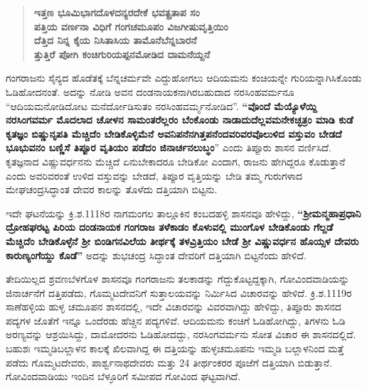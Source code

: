 \begin{verse}
\textbf{ಇತ್ತಣ ಭೂಮಿಭಾಗದೊಳದನ್ಯರದೇಕೆ ಭವತ್ಪ್ರತಾಪ ಸಂ} \\\textbf{ಪತ್ತಿಯ ವರ್ಣನಾ ವಿಧಿಗೆ ಗಂಗಚಮೂಪಂ ವಿಜಗೀಷುವೃತ್ತಿಯಿಂ} \\\textbf{ದೆತ್ತಿದ ನಿನ್ನ ಕೈಯ ನಿಸಿತಾಸಿಯ ತಾಮೊನೆಬೆನ್ನಬಾರನೆ} \\\textbf{ತ್ತುತ್ತಿರೆ ಪೋಗಿ ಕಂಚಿಗುರಿಯಪ್ಪನಮೋಡಿದ ದಾಮನೆಯ್ದನೆ}
\end{verse}

ಗಂಗರಾಜನು ಸೈನ್ಯದ ಹೊಡೆತಕ್ಕೆ ಬೆನ್ನಚರ್ಮವೇ ಎದ್ದುಹೋಗಲು ಆದಿಯಮನು ಕಂಚಿಯನ್ನೇ ಗುರಿಯನ್ನಾಗಿಸಿ\-ಕೊಂಡು ಓಡಿಹೋದನಂತೆ. ಅದನ್ನು ನೋಡಿ ಅವನ ದಂಡನಾಯಕನಾಗಿರಬಹುದಾದ ನರಸಿಂಹವರ್ಮನೂ “ಆದಿಯಮ\-ನೋಡಿದೋಟ ಮನೆರ್ದೋಡಿಸುತಂ ನರಸಿಂಹವರ್ಮ್ಮನೋಡಿದ”. \textbf{“ವೊಂದೆ ಮೆಯ್ಯೊಳೆಯ್ದಿ ನರಸಿಂಗವರ್ಮ ಮೊದಲಾದ ಚೋಳನ ಸಾಮಂತರೆಲ್ಲರಂ ಬೆಂಕೊಂಡು ನಾಡಾದುದೆಲ್ಲವಮನೇಕಚ್ಛತ್ರಂ ಮಾಡಿ ಕುಡೆ ಕೃತಜ್ಞಂ ಬಿಷ್ಣುನೃಪತಿ ಮೆಚ್ಚಿದೆಂ ಬೇಡಿಕೊಳ್ಳಿಮೆನೆ ಅವನಿಪನೆನಗಿತ್ತಪನೆಂದವರಿವರವೊಲುಳಿದ ವಸ್ತುವಂ ಬೇಡದೆ ಭೂಭುವನಂ ಬಣ್ಣಿಸೆ ತಿಪ್ಪೂರ ವೃತಿಯಂ ಪಡೆದಂ\general{\break } ಜಿನಾರ್ಚನಲುಬ್ಧಂ}” ಎಂದು ತಿಪ್ಪೂರು ಶಾಸನ ವರ್ಣಿಸಿದೆ. ಕೃತಜ್ಞನಾದ ವಿಷ್ಣುವರ್ಧನನು ಮೆಚ್ಚಿದೆ ಏನುಬೇಕಾದರೂ ಬೇಡಿಕೋ ಎಂದಾಗ, ರಾಜನು ಹೇಗಿದ್ದರೂ ಕೊಡುತ್ತಾನೆ ಎಂದು ಅವರಿವರಂತೆ ಉಳಿದ ವಸ್ತುವನ್ನು ಬೇಡದೆ, ತಿಪ್ಪೂರ ವೃತ್ತಿಯನ್ನು ಬೇಡಿ ತಮ್ಮ ಗುರುಗಳಾದ ಮೇಘಚಂದ್ರಸಿದ್ಧಾಂತ ದೇವರ ಕಾಲನ್ನು ತೊಳೆದು ದತ್ತಿಯಾಗಿ ಬಿಟ್ಟನು.

ಇದೇ ಘಟನೆಯನ್ನು ಕ್ರಿ.ಶ.1118ರ ನಾಗಮಂಗಲ ತಾಲ್ಲೂಕಿನ ಕಂಬದಹಳ್ಳಿ ಶಾಸನವೂ ಹೇಳಿದ್ದು, \textbf{“ಶ‍್ರೀಮನ್ಮಹಾ\-ಪ್ರಧಾನಿ ದ್ರೋಹಘರಟ್ಟ ಪಿರಿಯ ದಂಡನಾಯಕ ಗಂಗರಾಜ ತಳೆಕಾಡಂ ಕೊಳುವಲ್ಲಿ ಮುಂಗೊಳ ಬೇಡಿಕೊಂಡು ಗೆಲ್ದಡೆ ಮೆಚ್ಚಿದೆಂ ಬೇಡಿಕೊಳ್ಳೆನೆ ಶ‍್ರೀ ಬಿಂಡಿಗನವಿಲೆಯ ತೀರ್ಥಕ್ಕೆ ತಳವ್ರಿತ್ತಿಯಂ ಬೇಡೆ ಶ‍್ರೀ ವಿಷ್ಣುವರ್ಧನ ಹೊಯ್ಸಳ ದೇವರು ಕಾರುಣ್ಯಂಗೆಯ್ದು ಕೊಡೆ” }ಅದನ್ನು ಶುಭಚಂದ್ರ ಸಿದ್ಧಾಂತ ದೇವರಿಗೆ ದತ್ತಿಯಾಗಿ ಬಿಟ್ಟನೆಂದು ಹೇಳಿದೆ.

ತೇದಿಯಿಲ್ಲದ ಶ್ರವಣಬೆಳಗೊಳ ಶಾಸನವೂ ಗಂಗರಾಜನು ತಲಕಾಡನ್ನು ಗೆದ್ದುಕೊಟ್ಟದ್ದಕ್ಕಾಗಿ, ಗೋವಿಂದವಾಡಿಯನ್ನು ಜಿನಾರ್ಚನೆಗೆ ದತ್ತಿಪಡೆದು, ಗೊಮ್ಮಟದೇವನಿಗೆ ಸುತ್ತಾಲಯವನ್ನು ನಿರ್ಮಿಸಿದ ವಿಚಾರವನ್ನು ಹೇಳಿದೆ. ಕ್ರಿ.ಶ.1119ರ ಸಾಣೆಹಳ್ಳಿಯ ಹುಳ್ಳ ಚಮೂಪನ ಶಾಸನದಲ್ಲಿ, ಇದೇ ವಿಚಾರವನ್ನು ವಿವರವಾಗಿದ್ದು ಹೇಳಿದ್ದು, ತಿಪ್ಪೂರು ಶಾಸನದ ಪದ್ಯಗಳ ಜೊತೆಗೆ ಇನ್ನೂ ಒಂದೆರಡು ಹೆಚ್ಚಿನ ಪದ್ಯಗಳಿವೆ. ಆದಿಯಮನು ಕಂಚಿಗೆ ಓಡಿಹೋಗಿದ್ದು, ತಿಗಳನು ಓಡಿ ಅರಣ್ಯವನ್ನು ಆಶ್ರಯಿಸಿದ್ದು, ದಾಮೋದರನು ಓಡಿಹೋದದ್ದು, ನರಸಿಂಗವರ್ಮನು ಸೋತ ವಿಚಾರ ಈ ಶಾಸನದಲ್ಲಿದೆ. ಬಹುಶಃ ಇಮ್ಮಡಿಬಲ್ಲಾಳನ ಕಾಲಕ್ಕೆ ಖಿಲವಾಗಿದ್ದ ಈ ದತ್ತಿಯನ್ನು ಹುಳ್ಳಚಮೂಪನು ಇಮ್ಮಡಿ ಬಲ್ಲಾಳನಿಂದ ಮತ್ತೆ ಪಡೆದು ಗೊಮ್ಮಟದೇವರು, ಪಾರ್ಶ್ವನಾಥದೇವರು ಮತ್ತು 24 ತೀರ್ಥಂಕರರ ಪೂಜೆಗೆ ದತ್ತಿಯಾಗಿ ಬಿಡುತ್ತಾನೆ. ಗೋವಿಂದವಾಡಿಯು ಇಂದಿನ ಬೆಳ್ಳೂರಿಗೆ ಸಮೀಪದ ಗೋವಿಂದ ಘಟ್ಟವಾಗಿದೆ.

